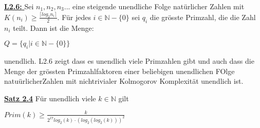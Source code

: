 \documentclass[8pt]{extreport}
\begin{document}
\underline{\textbf{L2.6: }} Sei $n_1,n_2,n_3...$ eine steigende unendliche Folge natürlicher Zahlen mit $K(n_i) \geq \frac{\lceil log_2n_i \rceil}{2}$. Für jedes $i \in \mathbb{N}- \{0\}$ sei $q_i$ die grösste Primzahl, die die Zahl $n_i$ teilt. Dann ist die Menge:
\begin{center}
$Q = \{q_i |i \in \mathbb{N} -\{0\}\}$
\end{center}
unendlich. L2.6 zeigt dass es unendlich viele Primzahlen gibt und auch dass die Menge der grössten Primzahlfaktoren einer beliebigen unendlichen FOlge natuürlicherZahlen mit nichtrivialer Kolmogorov Komplexität unendlich ist. 

\underline{\textbf{Satz 2.4}} Für unendlich viele $k \in \mathbb{N}$ gilt
\begin{center}
$Prim(k) \geq \frac{k}{2^{17}log_2(k) \cdot (log_2(log_2(k)))^2}$
\end{center}
\end{document}
